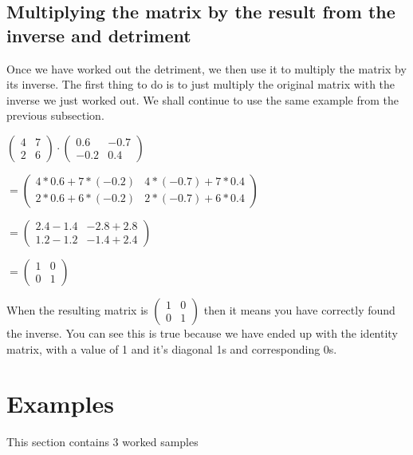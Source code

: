 \documentclass[options]{article}
\begin{document}
\subsection{Multiplying the matrix by the result from the inverse and detriment}
Once we have worked out the detriment, we then use it to multiply the matrix by its inverse. The first thing to do is to just multiply the original matrix with the inverse we just worked out.
We shall continue to use the same example from the previous subsection. 
\begin{center}
    \(
        \begin{pmatrix}
            4 & 7\\
            2 & 6
        \end{pmatrix}
        \cdot
        \begin{pmatrix}
            0.6 & -0.7\\
            -0.2 & 0.4
        \end{pmatrix}
    \)

    \(
        =
        \begin{pmatrix}
            4 * 0.6 + 7 * (-0.2) & 4 * (-0.7) + 7 * 0.4\\
            2 * 0.6 + 6 * (-0.2) & 2 * (-0.7) + 6 * 0.4
        \end{pmatrix}
    \)

    \(
        = 
        \begin{pmatrix}
            2.4 - 1.4 & -2.8 + 2.8\\
            1.2 - 1.2 & -1.4 + 2.4
        \end{pmatrix}
    \)

    \(
        =
        \begin{pmatrix}
            1 & 0\\
            0 & 1
        \end{pmatrix}
    \)
\end{center}
When the resulting matrix is \( \begin{pmatrix} 1 & 0\\0 & 1 \end{pmatrix} \) then it means you have correctly found the inverse.
You can see this is true because we have ended up with the identity matrix, with a value of 1 and it's diagonal 1s and corresponding 0s.
\section{Examples}
This section contains 3 worked samples 
\end{document}
